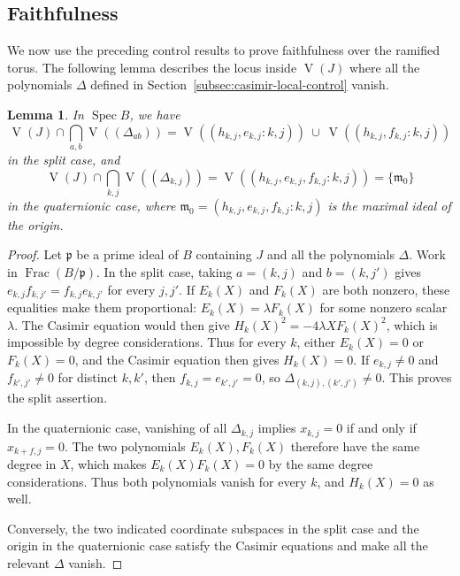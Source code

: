 \documentclass[11pt]{article}
\numberwithin{equation}{section}
\newtheorem{lemma}[theorem]{Lemma}
\theoremstyle{definition}
\theoremstyle{remark}
\DeclareMathOperator{\Spec}{Spec}
\DeclareMathOperator{\Frac}{Frac}
\begin{document}
\subsection{Faithfulness}\label{subsec:casimir-main}

We now use the preceding control results to prove faithfulness
over the ramified torus. The following lemma describes the locus
inside $\operatorname{V}(J)$ where all the polynomials $\Delta$ defined
in Section~\ref{subsec:casimir-local-control} vanish.

\begin{lemma}\label{lem:casimir-support-charts}
In $\Spec B$, we have 
\[
 \operatorname{V}(J)\cap\bigcap_{a,b}\operatorname{V}((\Delta_{ab}))
 =\operatorname{V}((h_{k,j},e_{k,j}:k,j))
       \ \cup\ \operatorname{V}((h_{k,j},f_{k,j}:k,j))
\]
in the split case, and 
\[
 \operatorname{V}(J)\cap\bigcap_{k,j}\operatorname{V}((\Delta_{k,j}))
 =\operatorname{V}((h_{k,j},e_{k,j},f_{k,j}:k,j))
 =\{\mathfrak m_0\}
\]
in the quaternionic case, 
where 
$\mathfrak m_0=(h_{k,j},e_{k,j},f_{k,j}:k,j)$ is the maximal ideal
of the origin.
\end{lemma}

\begin{proof}
Let $\mathfrak p$ be a prime ideal of $B$ containing
$J$ and all the polynomials $\Delta$.
Work in $\Frac(B/\mathfrak p)$.
In the split case, taking $a=(k,j)$ and $b=(k,j')$ gives
$e_{k,j}f_{k,j'}=f_{k,j}e_{k,j'}$ for every $j,j'$.
If $E_k(X)$ and $F_k(X)$ are both nonzero, these equalities
make them proportional: $E_k(X)=\lambda F_k(X)$ for some
nonzero scalar $\lambda$.
The Casimir equation would then give
$H_k(X)^2=-4\lambda X F_k(X)^2$, which is impossible by degree considerations. Thus for every $k$, either $E_k(X)=0$ or
$F_k(X)=0$, and the Casimir equation then gives $H_k(X)=0$.
If $e_{k,j}\ne0$ and $f_{k',j'}\ne0$ for distinct $k,k'$,
then $f_{k,j}=e_{k',j'}=0$, so $\Delta_{(k,j),(k',j')}\ne0$.
This proves the split assertion.

In the quaternionic case, vanishing of all $\Delta_{k,j}$ implies
$x_{k,j}=0$ if and only if $x_{k+f,j}=0$. The two polynomials
$E_k(X),F_k(X)$ therefore have the same
degree in $X$, which makes $E_k(X)F_k(X)=0$ by the same degree considerations.
Thus both polynomials vanish
for every $k$, and $H_k(X)=0$ as well. 

Conversely, the two indicated coordinate subspaces in the split
case and the origin in the quaternionic case satisfy the Casimir
equations and make all the relevant $\Delta$ vanish.
\end{proof}
\end{document}
